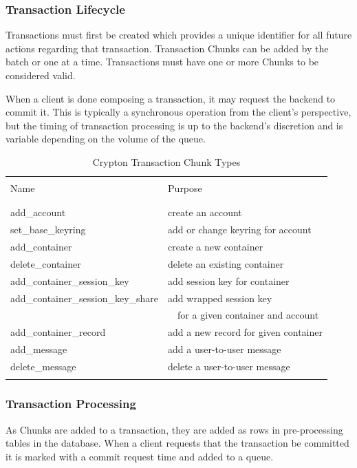 \documentclass[conference]{IEEEtran}
\begin{document}
\subsubsection{Transaction Lifecycle}
Transactions must first be created which provides a unique identifier for
all future actions regarding that transaction. Transaction Chunks can be added
by the batch or one at a time. Transactions must have one or more Chunks to be
considered valid.

When a client is done composing a transaction, it may request the backend
to commit it. This is typically a synchronous operation from the client's
perspective, but the timing of transaction processing is up to the backend's
discretion and is variable depending on the volume of the queue.

\begin{table}[ht]
\caption{Crypton Transaction Chunk Types}
\centering
\begin{tabular}{l l}
\hline\hline
\\ [0.1ex]
Name & Purpose \\
\\ [0.1ex]
\hline
\\ [0.3ex]
add\_account & create an account \\
set\_base\_keyring & add or change keyring for account \\
add\_container & create a new container \\
delete\_container & delete an existing container \\
add\_container\_session\_key & add session key for container \\
add\_container\_session\_key\_share & add wrapped session key \\ & \ \ for a
given container and account \\
add\_container\_record & add a new record for given container \\
add\_message & add a user-to-user message \\
delete\_message & delete a user-to-user message \\
\\ [0.3ex]
\hline
\end{tabular}
\label{table:nonlin}
\end{table}

\subsubsection{Transaction Processing}
As Chunks are added to a transaction, they are added as rows in
pre-processing tables in the database. When a client requests that the
transaction be committed it is marked with a commit request time and added
to a queue.
\end{document}
